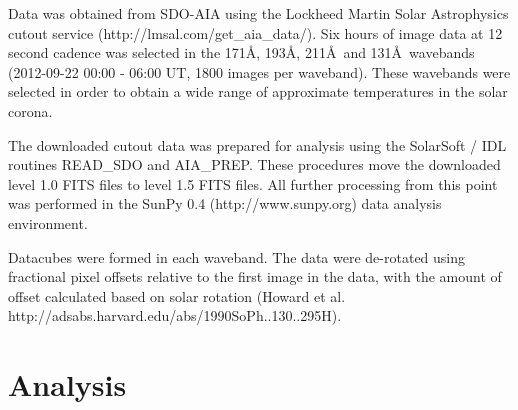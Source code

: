 \documentclass[manuscript]{../aastex52/aastex}
\begin{document}

Data was obtained from SDO-AIA using the Lockheed Martin Solar
Astrophysics cutout service (http://lmsal.com/get\_aia\_data/).  Six
hours of image data at 12 second cadence was selected in the 171\AA,
193\AA, 211\AA\ and 131\AA\ wavebands (2012-09-22 00:00 - 06:00 UT,
1800 images per waveband).  These wavebands were selected in order to
obtain a wide range of approximate temperatures in the solar corona.

The downloaded cutout data was prepared for analysis using the
SolarSoft / IDL routines READ\_SDO and AIA\_PREP.  These procedures
move the downloaded level 1.0 FITS files to level 1.5 FITS files.  All
further processing from this point was performed in the SunPy 0.4
(http://www.sunpy.org) data analysis environment.  

Datacubes were formed in each waveband.  The data were
de-rotated using fractional pixel offsets relative to the first image
in the data, with the amount of offset calculated based on solar
rotation (Howard et
al. http://adsabs.harvard.edu/abs/1990SoPh..130..295H).

\section{Analysis}


\end{document}
